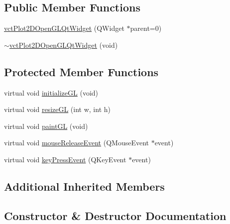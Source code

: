 \subsection*{Public Member Functions}
\begin{DoxyCompactItemize}
\item 
\hyperlink{classvct_plot2_d_open_g_l_qt_widget_a81449d7daf75fd115b3accb2b0be8e9e}{vct\+Plot2\+D\+Open\+G\+L\+Qt\+Widget} (Q\+Widget $\ast$parent=0)
\item 
\hyperlink{classvct_plot2_d_open_g_l_qt_widget_a01f9799efb902dff5d30b88ae5bb0d7c}{$\sim$vct\+Plot2\+D\+Open\+G\+L\+Qt\+Widget} (void)
\end{DoxyCompactItemize}
\subsection*{Protected Member Functions}
{\bf }\par
\begin{DoxyCompactItemize}
\item 
virtual void \hyperlink{classvct_plot2_d_open_g_l_qt_widget_ad220c52212210335c217804a2a9704e6}{initialize\+G\+L} (void)
\item 
virtual void \hyperlink{classvct_plot2_d_open_g_l_qt_widget_a6004ed472a5f8395171f9a32ec0010ec}{resize\+G\+L} (int w, int h)
\item 
virtual void \hyperlink{classvct_plot2_d_open_g_l_qt_widget_ad8638def4a77f3024e07ff6b1aad3485}{paint\+G\+L} (void)
\item 
virtual void \hyperlink{classvct_plot2_d_open_g_l_qt_widget_a9608618db7a9ac70533ae240b1abb776}{mouse\+Release\+Event} (Q\+Mouse\+Event $\ast$event)
\item 
virtual void \hyperlink{classvct_plot2_d_open_g_l_qt_widget_a451c4a3661a0196ceb11997a27d42ff3}{key\+Press\+Event} (Q\+Key\+Event $\ast$event)
\end{DoxyCompactItemize}

\subsection*{Additional Inherited Members}


\subsection{Constructor \& Destructor Documentation}
\hypertarget{classvct_plot2_d_open_g_l_qt_widget_a81449d7daf75fd115b3accb2b0be8e9e}{}
